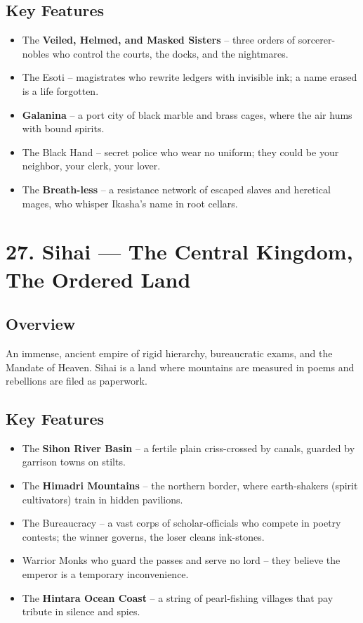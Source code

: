 \documentclass[11pt]{article}
\begin{document}
\subsection*{Key Features}
\begin{itemize}[leftmargin=*]
    \item The \textbf{Veiled, Helmed, and Masked Sisters} -- three orders of sorcerer-nobles who control the courts, the docks, and the nightmares.
    \item The Esoti -- magistrates who rewrite ledgers with invisible ink; a name erased is a life forgotten.
    \item \textbf{Galanina} -- a port city of black marble and brass cages, where the air hums with bound spirits.
    \item The Black Hand -- secret police who wear no uniform; they could be your neighbor, your clerk, your lover.  
    \item The \textbf{Breath-less} -- a resistance network of escaped slaves and heretical mages, who whisper Ikasha's name in root cellars.
\end{itemize}

\section*{27. Sihai --- The Central Kingdom, The Ordered Land}

\subsection*{Overview}
An immense, ancient empire of rigid hierarchy, bureaucratic exams, and the Mandate of Heaven. Sihai is a land where mountains are measured in poems and rebellions are filed as paperwork.

\subsection*{Key Features}
\begin{itemize}[leftmargin=*]
    \item The \textbf{Sihon River Basin} -- a fertile plain criss-crossed by canals, guarded by garrison towns on stilts.
    \item The \textbf{Himadri Mountains} -- the northern border, where earth-shakers (spirit cultivators) train in hidden pavilions.
    \item The Bureaucracy -- a vast corps of scholar-officials who compete in poetry contests; the winner governs, the loser cleans ink-stones.
    \item Warrior Monks who guard the passes and serve no lord -- they believe the emperor is a temporary inconvenience.
    \item The \textbf{Hintara Ocean Coast} -- a string of pearl-fishing villages that pay tribute in silence and spies.
\end{itemize}
\end{document}
